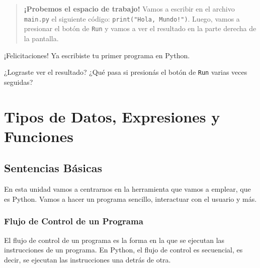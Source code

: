 \documentclass[
  letterpaper,
  DIV=11,
  numbers=noendperiod]{scrreprt}
\begin{document}
\begin{quote}
\textbf{¡Probemos el espacio de trabajo!} Vamos a escribir en el archivo
\texttt{main.py} el siguiente código: \texttt{print("Hola,\ Mundo!")}.
Luego, vamos a presionar el botón de \texttt{Run} y vamos a ver el
resultado en la parte derecha de la pantalla.
\end{quote}

¡Felicitaciones! Ya escribiste tu primer programa en Python.

\begin{tcolorbox}[enhanced jigsaw, bottomrule=.15mm, leftrule=.75mm, opacityback=0, colback=white, toprule=.15mm, bottomtitle=1mm, opacitybacktitle=0.6, rightrule=.15mm, left=2mm, arc=.35mm, coltitle=black, title=\textcolor{quarto-callout-note-color}{\faInfo}\hspace{0.5em}{}, breakable, toptitle=1mm, colframe=quarto-callout-note-color-frame, titlerule=0mm, colbacktitle=quarto-callout-note-color!10!white]

¿Lograste ver el resultado? ¿Qué pasa si presionás el botón de
\texttt{Run} varias veces seguidas?\\

\end{tcolorbox}


\chapter{Tipos de Datos, Expresiones y
Funciones}\label{tipos-de-datos-expresiones-y-funciones}

\section{Sentencias Básicas}\label{sentencias-buxe1sicas}

En esta unidad vamos a centrarnos en la herramienta que vamos a emplear,
que es Python. Vamos a hacer un programa sencillo, interactuar con el
usuario y más.

\subsection{Flujo de Control de un
Programa}\label{flujo-de-control-de-un-programa}

El flujo de control de un programa es la forma en la que se ejecutan las
instrucciones de un programa. En Python, el flujo de control es
secuencial, es decir, se ejecutan las instrucciones una detrás de otra.
\end{document}
